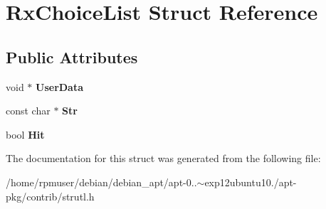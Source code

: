 \section{\-Rx\-Choice\-List \-Struct \-Reference}
\label{structRxChoiceList}
\subsection*{\-Public \-Attributes}
\begin{DoxyCompactItemize}
\item 
void $\ast$ {\bfseries \-User\-Data}\label{structRxChoiceList_a95e9428e2338955907e513203842a9ec}

\item 
const char $\ast$ {\bfseries \-Str}\label{structRxChoiceList_a83ddceec53599310a13048586c0a8586}

\item 
bool {\bfseries \-Hit}\label{structRxChoiceList_a8db34823a4547b90cf7c26ef7921a26f}

\end{DoxyCompactItemize}


\-The documentation for this struct was generated from the following file\-:\begin{DoxyCompactItemize}
\item 
/home/rpmuser/debian/debian\-\_\-apt/apt-\/0..$\sim$exp12ubuntu10./apt-\/pkg/contrib/strutl.\-h\end{DoxyCompactItemize}
